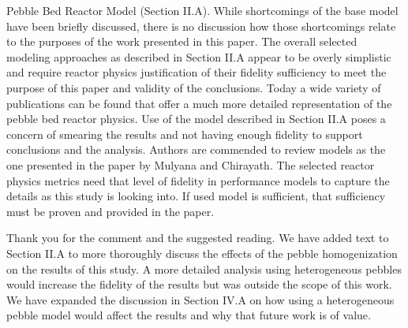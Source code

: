 \documentclass[answers,11pt]{exam}
\begin{document}
\begin{questions}
        \question Pebble Bed Reactor Model (Section II.A). While shortcomings of the
        base model have been briefly discussed, there is no discussion how those
        shortcomings relate to the purposes of the work presented in this paper. The
        overall selected modeling approaches as described in Section II.A appear to be
        overly simplistic and require reactor physics justification of their fidelity
        sufficiency to meet the purpose of this paper and validity of the conclusions.
        Today a wide variety of publications can be found that offer a much more
        detailed representation of the pebble bed reactor physics. Use of the model
        described in Section II.A poses a concern of smearing the results and not
        having enough fidelity to support conclusions and the analysis. Authors are
        commended to review models as the one presented in the paper by Mulyana and
        Chirayath\cite{mulyana_impact_2022}.
        The selected reactor physics metrics need that level of fidelity in
        performance models to capture the details as this study is looking into. If used model is sufficient, that sufficiency must be proven and provided in the paper.
        \begin{solution}
                Thank you for the comment and the suggested reading. We have added
                text to Section II.A to more thoroughly discuss the effects of 
                the pebble homogenization on the results of this study. A more 
                detailed analysis using heterogeneous pebbles would increase 
                the fidelity of the results but was outside the scope of this work. 
                We have expanded the discussion in Section IV.A on how using 
                a heterogeneous pebble model would affect the results and why 
                that future work is of value. 
        \end{solution}
         


\end{questions}
\end{document}
